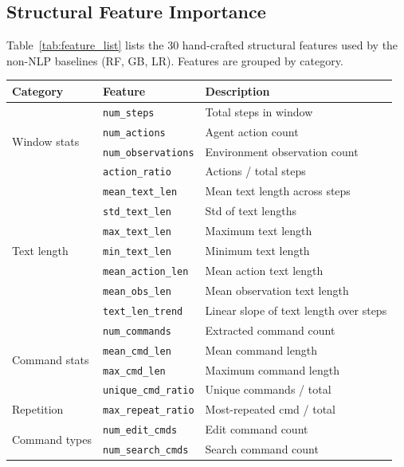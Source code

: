 \subsection{Structural Feature Importance}
\label{sec:app_features}

Table~\ref{tab:feature_list} lists the 30 hand-crafted structural features used by the non-NLP baselines (RF, GB, LR).
Features are grouped by category.

\begin{table}[h]
\centering
\small
\begin{tabular}{lll}
\toprule
\textbf{Category} & \textbf{Feature} & \textbf{Description} \\
\midrule
\multirow{4}{*}{Window stats}
  & \texttt{num\_steps} & Total steps in window \\
  & \texttt{num\_actions} & Agent action count \\
  & \texttt{num\_observations} & Environment observation count \\
  & \texttt{action\_ratio} & Actions / total steps \\
\midrule
\multirow{7}{*}{Text length}
  & \texttt{mean\_text\_len} & Mean text length across steps \\
  & \texttt{std\_text\_len} & Std of text lengths \\
  & \texttt{max\_text\_len} & Maximum text length \\
  & \texttt{min\_text\_len} & Minimum text length \\
  & \texttt{mean\_action\_len} & Mean action text length \\
  & \texttt{mean\_obs\_len} & Mean observation text length \\
  & \texttt{text\_len\_trend} & Linear slope of text length over steps \\
\midrule
\multirow{4}{*}{Command stats}
  & \texttt{num\_commands} & Extracted command count \\
  & \texttt{mean\_cmd\_len} & Mean command length \\
  & \texttt{max\_cmd\_len} & Maximum command length \\
  & \texttt{unique\_cmd\_ratio} & Unique commands / total \\
\midrule
\multirow{1}{*}{Repetition}
  & \texttt{max\_repeat\_ratio} & Most-repeated cmd / total \\
\midrule
\multirow{6}{*}{Command types}
  & \texttt{num\_edit\_cmds} & Edit command count \\
  & \texttt{num\_search\_cmds} & Search command count \\

\end{tabular}
\end{table}

